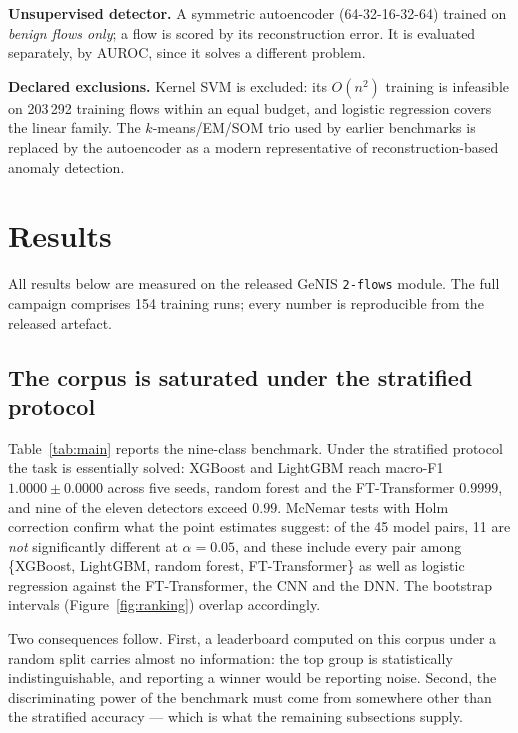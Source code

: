 \documentclass[review,12pt]{elsarticle}
\begin{document}
\textbf{Unsupervised detector.} A symmetric autoencoder (64-32-16-32-64) trained on
\emph{benign flows only}; a flow is scored by its reconstruction error. It is evaluated
separately, by AUROC, since it solves a different problem.

\textbf{Declared exclusions.} Kernel SVM is excluded: its $O(n^2)$ training is
infeasible on 203\,292 training flows within an equal budget, and logistic regression
covers the linear family. The $k$-means/EM/SOM trio used by earlier benchmarks
\cite{maseer2021benchmarking} is replaced by the autoencoder as a modern representative
of reconstruction-based anomaly detection.

\section{Results}
\label{sec:results}

All results below are measured on the released GeNIS \texttt{2-flows} module. The full
campaign comprises 154 training runs; every number is reproducible from the released
artefact.

\subsection{The corpus is saturated under the stratified protocol}
\label{sec:saturation}
Table~\ref{tab:main} reports the nine-class benchmark. Under the stratified protocol the
task is essentially solved: XGBoost and LightGBM reach macro-F1 $1.0000 \pm 0.0000$
across five seeds, random forest and the FT-Transformer $0.9999$, and nine of the eleven
detectors exceed $0.99$. McNemar tests with Holm correction confirm what the point
estimates suggest: of the 45 model pairs, 11 are \emph{not} significantly different at
$\alpha = 0.05$, and these include every pair among
\{XGBoost, LightGBM, random forest, FT-Transformer\} as well as logistic regression
against the FT-Transformer, the CNN and the DNN. The bootstrap intervals
(Figure~\ref{fig:ranking}) overlap accordingly.

Two consequences follow. First, a leaderboard computed on this corpus under a random
split carries almost no information: the top group is statistically indistinguishable, and
reporting a winner would be reporting noise. Second, the discriminating power of the
benchmark must come from somewhere other than the stratified accuracy --- which is what
the remaining subsections supply.
\end{document}
